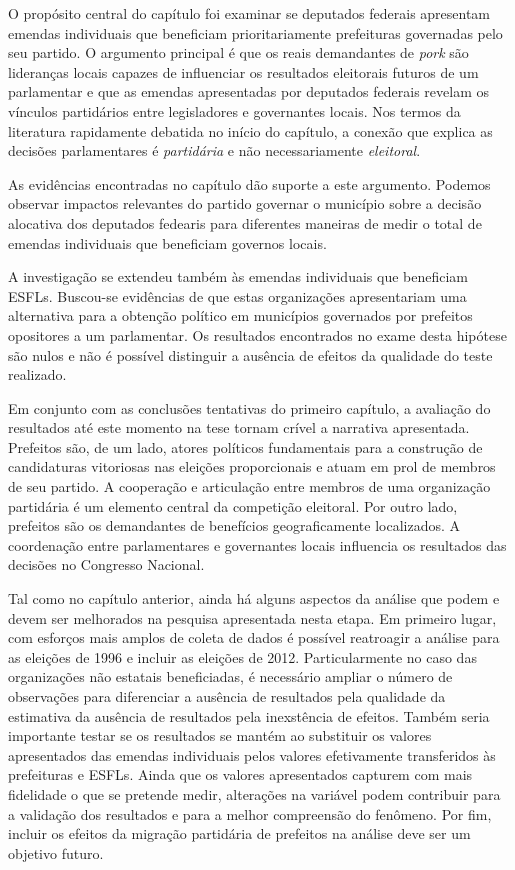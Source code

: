 O propósito central do capítulo foi examinar se deputados federais apresentam emendas individuais que beneficiam prioritariamente prefeituras governadas pelo seu partido. O argumento principal é que os reais demandantes de \emph{pork} são lideranças locais capazes de influenciar os resultados eleitorais futuros de um parlamentar e que as emendas apresentadas por deputados federais revelam os vínculos partidários entre legisladores e governantes locais. Nos termos da literatura rapidamente debatida no início do capítulo, a conexão que explica as decisões parlamentares é \emph{partidária} e não necessariamente \emph{eleitoral}.

As evidências encontradas no capítulo dão suporte a este argumento. Podemos observar impactos relevantes do partido governar o município sobre a decisão alocativa dos deputados fedearis para diferentes maneiras de medir o total de emendas individuais que beneficiam governos locais.

A investigação se extendeu também às emendas individuais que beneficiam ESFLs. Buscou-se evidências de que estas organizações apresentariam uma alternativa para a obtenção político em municípios governados por prefeitos opositores a um parlamentar. Os resultados encontrados no exame desta hipótese são nulos e não é possível distinguir a ausência de efeitos da qualidade do teste realizado.

Em conjunto com as conclusões tentativas do primeiro capítulo, a avaliação do resultados até este momento na tese tornam crível a narrativa apresentada. Prefeitos são, de um lado, atores políticos fundamentais para a construção de candidaturas vitoriosas nas eleições proporcionais e atuam em prol de membros de seu partido. A cooperação e articulação entre membros de uma organização partidária é um elemento central da competição eleitoral. Por outro lado, prefeitos são os demandantes de benefícios geograficamente localizados. A coordenação entre parlamentares e governantes locais influencia os resultados das decisões no Congresso Nacional.

Tal como no capítulo anterior, ainda há alguns aspectos da análise que podem e devem ser melhorados na pesquisa apresentada nesta etapa. Em primeiro lugar, com esforços mais amplos de coleta de dados é possível reatroagir a análise para as eleições de 1996 e incluir as eleições de 2012. Particularmente no caso das organizações não estatais beneficiadas, é necessário ampliar o número de observações para diferenciar a ausência de resultados pela qualidade da estimativa da ausência de resultados pela inexstência de efeitos. Também seria importante testar se os resultados se mantém ao substituir os valores apresentados das emendas individuais pelos valores efetivamente transferidos às prefeituras e ESFLs. Ainda que os valores apresentados capturem com mais fidelidade o que se pretende medir, alterações na variável podem contribuir para a validação dos resultados e para a melhor compreensão do fenômeno. Por fim, incluir os efeitos da migração partidária de prefeitos na análise deve ser um objetivo futuro.